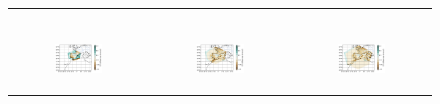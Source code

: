 \begin{figure}[htbp]
\begin{tabular}{ccc}
\begin{subfigure}[b]{0.33\textwidth}
        \end{subfigure} \\
        
        \begin{subfigure}[b]{0.33\textwidth}
            \caption{}
            \includegraphics[width=\textwidth]{images/chap4/domain_size/diff_map_evap_era_LAM_1000km_NBP40.png}
        \end{subfigure} &
        \begin{subfigure}[b]{0.33\textwidth}
            \caption{}
            \includegraphics[width=\textwidth]{images/chap4/domain_size/diff_map_evap_era_LAM_1500km_NBP60.png}
        \end{subfigure} &
        \begin{subfigure}[b]{0.33\textwidth}
            \caption{}
            \includegraphics[width=\textwidth]{images/chap4/domain_size/diff_map_evap_era_LAM_2000km_NBP80.png}

\end{subfigure}
\end{tabular}
\end{figure}
